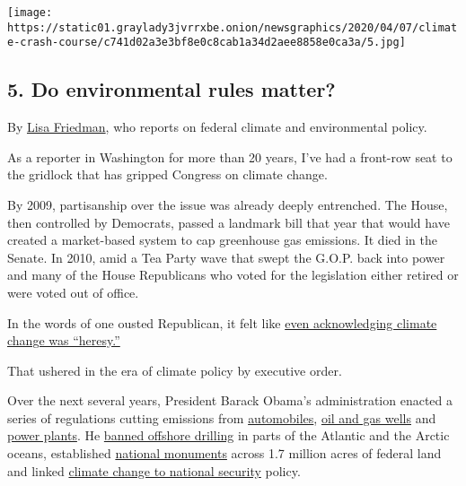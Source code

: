 \texttt{[image: https://static01.graylady3jvrrxbe.onion/newsgraphics/2020/04/07/climate-crash-course/c741d02a3e3bf8e0c8cab1a34d2aee8858e0ca3a/5.jpg]}

\hypertarget{5-do-environmental-rules-matter}{%
\subsection{\texorpdfstring{\textbf{5.} Do environmental rules
matter?}{5. Do environmental rules matter?}}\label{5-do-environmental-rules-matter}}

By \href{https://www.nytimes3xbfgragh.onion/by/lisa-friedman}{Lisa
Friedman}, who reports on federal climate and environmental policy.

As a reporter in Washington for more than 20 years, I've had a front-row
seat to the gridlock that has gripped Congress on climate change.

By 2009, partisanship over the issue was already deeply entrenched. The
House, then controlled by Democrats, passed a landmark bill that year
that would have created a market-based system to cap greenhouse gas
emissions. It died in the Senate. In 2010, amid a Tea Party wave that
swept the G.O.P. back into power and many of the House Republicans who
voted for the legislation either retired or were voted out of office.

In the words of one ousted Republican, it felt like
\href{https://www.pbs.org/wgbh/frontline/article/bob-inglis-climate-change-and-the-republican-party/}{even
acknowledging climate change was ``heresy.''}

That ushered in the era of climate policy by executive order.

Over the next several years, President Barack Obama's administration
enacted a series of regulations cutting emissions from
\href{https://www.nytimes3xbfgragh.onion/2009/01/26/world/americas/26iht-26calif.19665165.html?searchResultPosition=6}{automobiles},
\href{https://www.nytimes3xbfgragh.onion/2015/01/14/us/politics/obama-administration-to-unveil-plans-to-cut-methane-emissions.html?searchResultPosition=25}{oil
and gas wells} and
\href{https://www.nytimes3xbfgragh.onion/2009/10/01/science/earth/01epa.html?searchResultPosition=18}{power
plants}. He
\href{https://www.nytimes3xbfgragh.onion/2016/12/20/us/obama-drilling-ban-arctic-atlantic.html}{banned
offshore drilling} in parts of the Atlantic and the Arctic oceans,
established
\href{https://www.nytimes3xbfgragh.onion/2016/12/28/us/politics/obama-national-monument-bears-ears-utah-gold-butte.html}{national
monuments} across 1.7 million acres of federal land and linked
\href{https://www.nytimes3xbfgragh.onion/2015/05/21/us/obama-recasts-climate-change-as-a-more-far-reaching-peril.html}{climate
change to national security} policy.

